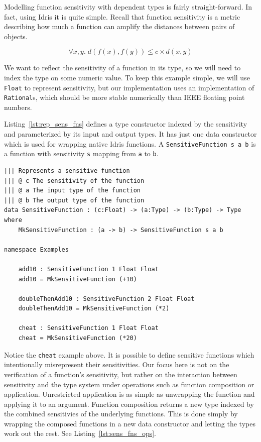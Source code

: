 \documentclass[12pt]{article}
\begin{document}
Modelling function sensitivity with dependent types is fairly straight-forward.
In fact, using Idris it is quite simple.
Recall that function sensitivity is a metric describing how much a function can amplify the distances between pairs of objects.

$$ \forall x,y.\; d(f(x),f(y)) \le c \times d(x,y) $$

We want to reflect the sensitivity of a function in its type, so we will need to index the type on some numeric value.
To keep this example simple, we will use \texttt{Float} to represent sensitivity, but our implementation uses an implementation of \texttt{Rational}s, which should be more stable numerically than IEEE floating point numbers.

Listing~\ref{lst:rep_sens_fns} defines a type constructor indexed by the sensitivity and parameterized by its input and output types.
It has just one data constructor which is used for wrapping native Idris functions.
A \texttt{SensitiveFunction s a b} is a function with sensitivity \texttt{s} mapping from \texttt{a} to \texttt{b}.

\begin{lstlisting}[caption={Representing sensitive functions},label={lst:rep_sens_fns}]
||| Represents a sensitive function
||| @ c The sensitivity of the function
||| @ a The input type of the function
||| @ b The output type of the function
data SensitiveFunction : (c:Float) -> (a:Type) -> (b:Type) -> Type where
    MkSensitiveFunction : (a -> b) -> SensitiveFunction s a b

namespace Examples

    add10 : SensitiveFunction 1 Float Float
    add10 = MkSensitiveFunction (+10)

    doubleThenAdd10 : SensitiveFunction 2 Float Float
    doubleThenAdd10 = MkSensitiveFunction (*2)

    cheat : SensitiveFunction 1 Float Float
    cheat = MkSensitiveFunction (*20)
\end{lstlisting}

Notice the \texttt{cheat} example above.
It is possible to define sensitive functions which intentionally misrepresent their sensitivities.
Our focus here is not on the verification of a function's sensitivity, but rather on the interaction between sensitivity and the type system under operations such as function composition or application.
Unrestricted application is as simple as unwrapping the function and applying it to an argument.
Function composition returns a new type indexed by the combined sensitivies of the underlying functions.
This is done simply by wrapping the composed functions in a new data constructor and letting the types work out the rest.
See Listing~\ref{lst:sens_fns_ops}.
\end{document}
